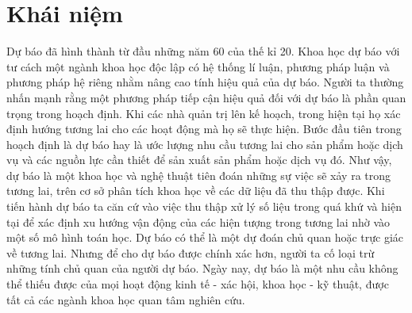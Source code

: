 \section{Khái niệm}
\label{sec:intro:khainiem}
Dự báo đã hình thành từ đầu những năm 60 của thế kỉ 20. Khoa học dự báo với tư cách một ngành khoa học độc lập có hệ thống lí luận, phương pháp luận và phương pháp hệ riêng nhằm nâng cao tính hiệu quả của dự báo. Người ta thường nhấn mạnh rằng một phương pháp tiếp cận hiệu quả đối với dự báo là phần quan trọng trong hoạch định. Khi các nhà quản trị lên kế hoạch, trong hiện tại họ xác định hướng tương lai cho các hoạt động mà họ sẽ thực hiện. Bước đầu tiên trong hoạch định là dự báo hay là ước lượng nhu cầu tương lai cho sản phẩm hoặc dịch vụ và các nguồn lực cần thiết để sản xuất sản phẩm hoặc dịch vụ đó.
Như vậy, dự báo là một khoa học và nghệ thuật tiên đoán những sự việc sẽ xảy ra trong tương lai, trên cơ sở phân tích khoa học về các dữ liệu đã thu thập được.
Khi tiến hành dự báo ta căn cứ vào việc thu thập xử lý số liệu trong quá khứ và hiện tại để xác định xu hướng vận động của các hiện tượng trong tương lai nhờ vào một số mô hình toán học.
Dự báo có thể là một dự đoán chủ quan hoặc trực giác về tương lai. Nhưng để cho dự báo được chính xác hơn, người ta cố loại trừ những tính chủ quan của người dự báo.
Ngày nay, dự báo là một nhu cầu không thể thiếu được của mọi hoạt động kinh tế - xác hội, khoa học - kỹ thuật, được tất cả các ngành khoa học quan tâm nghiên cứu.
